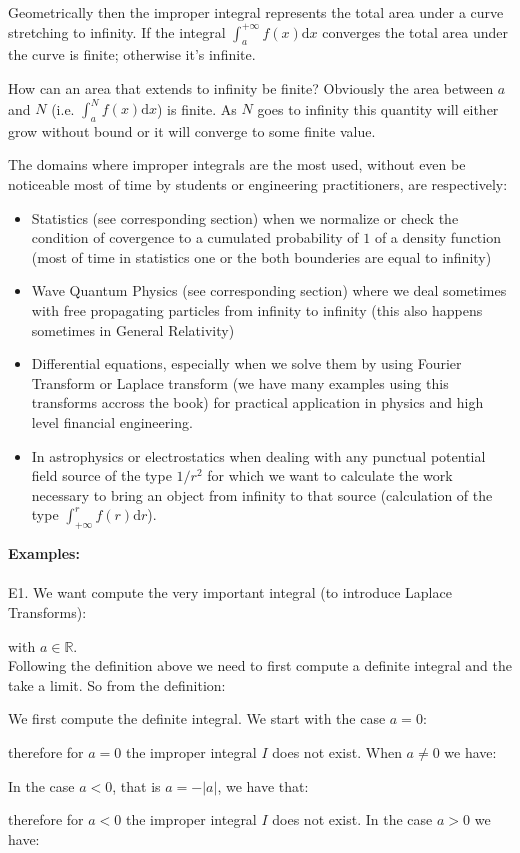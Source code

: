 	Geometrically then the improper integral represents the total area under a curve stretching to infinity. If the integral $\int_a^{+\infty} f(x)\mathrm{d}x$ converges the total area under the curve is finite; otherwise it's infinite.
	
	How can an area that extends to infinity be finite?  Obviously the area between $a$ and $N$ (i.e. $\int_a^N f(x)\mathrm{d}x$) is finite.  As $N$ goes to infinity this quantity will either grow without bound or it will converge to some finite value. 
	
	The domains where improper integrals are the most used, without even be noticeable most of time by students or engineering practitioners, are respectively:
	\begin{itemize}
		\item Statistics (see corresponding section) when we normalize or check the condition of covergence to a cumulated probability of $1$ of a density function (most of time in statistics one or the both bounderies are equal to infinity)

		\item Wave Quantum Physics (see corresponding section) where we deal sometimes with free propagating particles from infinity to infinity (this also happens sometimes in General Relativity)

		\item Differential equations, especially when we solve them by using Fourier Transform or Laplace transform (we have many examples using this transforms accross the book) for practical application in physics and high level financial engineering.

		\item In astrophysics or electrostatics when dealing with any punctual potential field source of the type $1/r^2$  for which we want to calculate the work necessary to bring an object from infinity to that source (calculation of the type $\int_{+\infty}^{r} f(r)\mathrm{d}r$).
	\end{itemize}
	\begin{tcolorbox}[colframe=black,colback=white,sharp corners]
	\textbf{{\Large {}}Examples:}\\\\
	E1. We want compute the very important integral (to introduce Laplace Transforms):
	
	with $a\in\mathbb{R}$.\\
	
	Following the definition above we need to first compute a definite integral and the take a limit. So from the definition:
	
	We first compute the definite integral. We start with the case $a=0$:
	
	therefore for $a=0$ the improper integral $I$ does not exist. When $a\neq 0$ we have:
	
	In the case $a<0$, that is $a=-|a|$, we have that:
	
	therefore for $a<0$ the improper integral $I$ does not exist. In the case $a>0$ we have:
	
	\end{tcolorbox}
	
